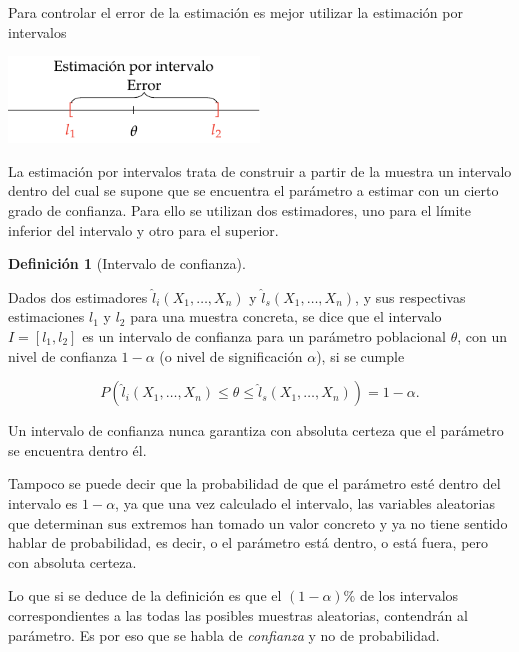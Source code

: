 \documentclass[
  a4paper,
]{scrreport}
\theoremstyle{plain}
\theoremstyle{definition}
\newtheorem{definition}{Definición}[chapter]
\theoremstyle{definition}
\theoremstyle{remark}
\begin{document}
Para controlar el error de la estimación es mejor utilizar la estimación
por intervalos

\begin{center}
\includegraphics[width=0.5\textwidth,height=\textheight]{img/estimacion/error-estimacion-intervalo.pdf}
\end{center}

La estimación por intervalos trata de construir a partir de la muestra
un intervalo dentro del cual se supone que se encuentra el parámetro a
estimar con un cierto grado de confianza. Para ello se utilizan dos
estimadores, uno para el límite inferior del intervalo y otro para el
superior.

\begin{definition}[Intervalo de
confianza]\protect\hypertarget{def-intervalo-confianza}{}\label{def-intervalo-confianza}

Dados dos estimadores \(\hat l_i(X_1,\ldots,X_n)\) y
\(\hat l_s(X_1,\ldots,X_n)\), y sus respectivas estimaciones \(l_1\) y
\(l_2\) para una muestra concreta, se dice que el intervalo
\(I=[l_1,l_2]\) es un intervalo de confianza para un parámetro
poblacional \(\theta\), con un nivel de confianza \(1-\alpha\) (o nivel
de significación \(\alpha\)), si se cumple

\[
P(\hat l_i(X_1,\ldots,X_n)\leq \theta \leq \hat l_s(X_1,\ldots,X_n))= 1-\alpha.
\]

\end{definition}

Un intervalo de confianza nunca garantiza con absoluta certeza que el
parámetro se encuentra dentro él.

Tampoco se puede decir que la probabilidad de que el parámetro esté
dentro del intervalo es \(1-\alpha\), ya que una vez calculado el
intervalo, las variables aleatorias que determinan sus extremos han
tomado un valor concreto y ya no tiene sentido hablar de probabilidad,
es decir, o el parámetro está dentro, o está fuera, pero con absoluta
certeza.

Lo que si se deduce de la definición es que el \((1-\alpha)\%\) de los
intervalos correspondientes a las todas las posibles muestras
aleatorias, contendrán al parámetro. Es por eso que se habla de
\emph{confianza} y no de probabilidad.
\end{document}
